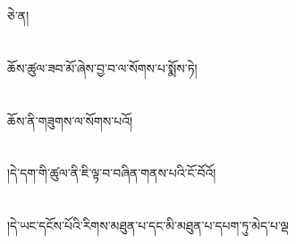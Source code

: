 ཅེ་ན།\chapter{ }ཆོས་ཚུལ་ཟབ་མོ་ཞེས་བྱ་བ་ལ་སོགས་པ་སྨོས་ཏེ།\chapter{ }ཆོས་ནི་གཟུགས་ལ་སོགས་པའོ།\chapter{ }།དེ་དག་གི་ཚུལ་ནི་ཇི་ལྟ་བ་བཞིན་གནས་པའི་ངོ་བོའོ།\chapter{ }།དེ་ཡང་དངོས་པོའི་རིགས་མཐུན་པ་དང་མི་མཐུན་པ་དཔག་ཏུ་མེད་པ་ལྡ